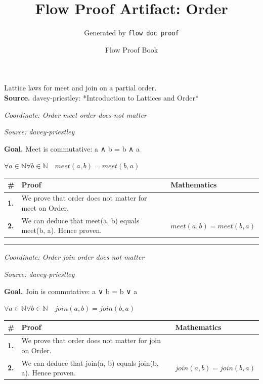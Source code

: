 \documentclass[11pt]{article}
\title{Flow Proof Artifact: Order}
\author{Generated by \texttt{flow doc proof}}
\date{Flow Proof Book}
\theoremstyle{definition}
\begin{document}
\maketitle
Lattice laws for meet and join on a partial order.\\[0.5em]
\textbf{Source.} davey-priestley: *Introduction to Lattices and Order*\\[0.5em]
\bigskip
{}\par
\smallskip\noindent\textit{Coordinate: Order \cdot meet \cdot order does not matter}\par
\smallskip\noindent\textit{Source: davey-priestley}\par
\medskip
\noindent\textbf{Goal.} Meet is commutative: a ∧ b = b ∧ a\par
\noindent$\displaystyle \forall a \in \mathbb{N} \forall b \in \mathbb{N}\quad meet(a, b) = meet(b, a)$\par
\medskip
\noindent
\begin{tabular}{@{} >{\raggedright\arraybackslash}p{} >{\raggedright\arraybackslash}p{} >{\raggedleft\arraybackslash}p{} @{}}
\textbf{\#} & \textbf{Proof} & \textbf{Mathematics} \\
\midrule
\textbf{1.} & We prove that order does not matter for meet on Order. & \\[0.45em]
\textbf{2.} & We can deduce that meet(a, b) equals meet(b, a). Hence proven. & $\displaystyle meet(a, b) = meet(b, a)$ \\[0.45em]
\bottomrule
\end{tabular}
\label{thm:Order-meet-order_does_not_matter}
\par\medskip\hrule
\bigskip
{}\par
\smallskip\noindent\textit{Coordinate: Order \cdot join \cdot order does not matter}\par
\smallskip\noindent\textit{Source: davey-priestley}\par
\medskip
\noindent\textbf{Goal.} Join is commutative: a ∨ b = b ∨ a\par
\noindent$\displaystyle \forall a \in \mathbb{N} \forall b \in \mathbb{N}\quad join(a, b) = join(b, a)$\par
\medskip
\noindent
\begin{tabular}{@{} >{\raggedright\arraybackslash}p{} >{\raggedright\arraybackslash}p{} >{\raggedleft\arraybackslash}p{} @{}}
\textbf{\#} & \textbf{Proof} & \textbf{Mathematics} \\
\midrule
\textbf{1.} & We prove that order does not matter for join on Order. & \\[0.45em]
\textbf{2.} & We can deduce that join(a, b) equals join(b, a). Hence proven. & $\displaystyle join(a, b) = join(b, a)$ \\[0.45em]
\bottomrule
\end{tabular}
\end{document}
